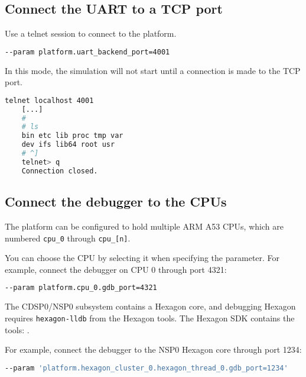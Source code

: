 \subsection{Connect the UART to a TCP port}

Use a telnet session to connect to the platform. \leavevmode

\small
\begin{lstlisting}[language=bash]
    --param platform.uart_backend_port=4001
\end{lstlisting}
\normalsize

In this mode, the simulation will not start until a connection is made to the TCP port.

\small
\begin{lstlisting}[language=bash]
    telnet localhost 4001
    [...]
    #
    # ls
    bin etc lib proc tmp var
    dev ifs lib64 root usr
    # ^]
    telnet> q
    Connection closed.
\end{lstlisting}
\normalsize



\clearpage
\subsection{Connect the debugger to the CPUs}

The platform can be configured to hold multiple ARM A53 CPUs, which are numbered {\small{\lstinline!cpu_0!}} through {\small{\lstinline!cpu_[n]!}}.

You can choose the CPU by selecting it when specifying the parameter. For example, connect the debugger on CPU 0 through port 4321:

\small
\begin{lstlisting}[language=bash]
    --param platform.cpu_0.gdb_port=4321
\end{lstlisting}
\normalsize

The CDSP0/NSP0 subsystem contains a Hexagon core, and debugging Hexagon
requires {\small{\lstinline!hexagon-lldb!}} from the Hexagon tools.  The Hexagon SDK
contains the tools: {}.

For example, connect the debugger to the NSP0 Hexagon core through port 1234:

\small
\begin{lstlisting}[language=bash]
    --param 'platform.hexagon_cluster_0.hexagon_thread_0.gdb_port=1234'
\end{lstlisting}
\normalsize

